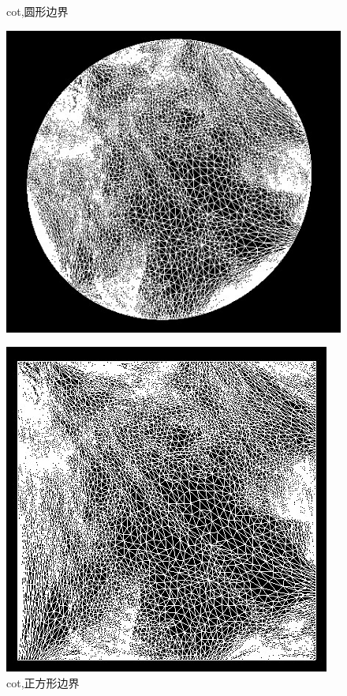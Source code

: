 \documentclass{article}
\begin{document}
	\begin{figure}[htbp]
		\centering
		\begin{minipage}{0.24\linewidth}
			\centering
			\caption{cot,圆形边界}
			\includegraphics[width=1\linewidth]{gargoyle_circle.JPG}
			\label{chutian1}%
		\end{minipage}
		\begin{minipage}{0.24\linewidth}
			\centering
			\caption{cot,正方形边界}
			\includegraphics[width=1\linewidth]{gargoyle_square.JPG}

\end{minipage}
\end{figure}
\end{document}
